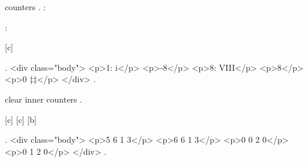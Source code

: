 counters
.
\thec: 

\addtocounter{c}{3 * -(2+1)}    %

\thec: 

\the\value{c}

[c]
\setcounter{a}{\value{c}}

.
<div class="body">
<p>1: i</p>
<p>-8</p>
<p>8: VIII</p>
<p>8</p>
<p>0 ‡‡</p>
</div>
.


clear inner counters
.

[c]	%
[c]
[b]

\setcounter{a}{5}
\setcounter{b}{6}
\setcounter{d}{3}




.
<div class="body">
<p>5 6 1 3</p>
<p>6 6 1 3</p>
<p>0 0 2 0</p>
<p>0 1 2 0</p>
</div>
.